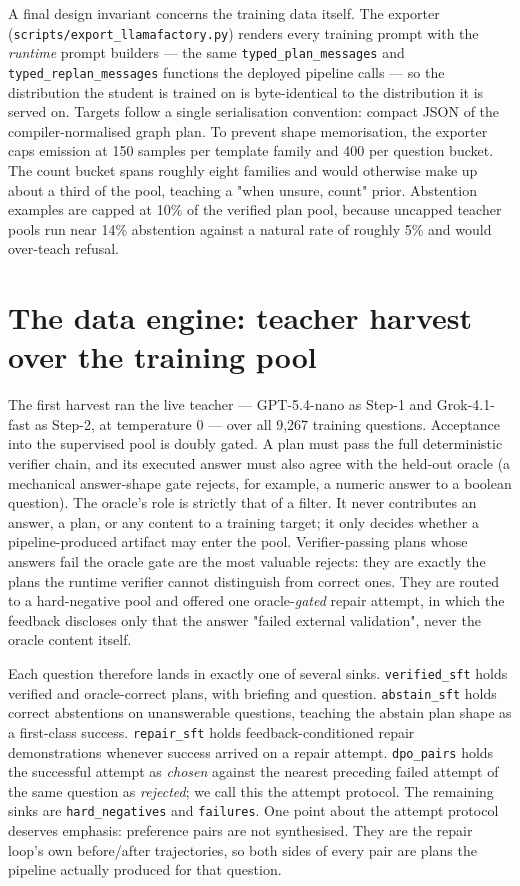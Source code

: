 A final design invariant concerns the training data itself. The exporter
(\texttt{scripts/export\_llamafactory.py}) renders every training prompt with the \emph{runtime} prompt
builders --- the same \texttt{typed\_plan\_messages} and \texttt{typed\_replan\_messages} functions the deployed
pipeline calls --- so the distribution the student is trained on is byte-identical to the
distribution it is served on. Targets follow a single serialisation convention: compact JSON
of the compiler-normalised graph plan. To prevent shape memorisation, the exporter caps
emission at 150 samples per template family and 400 per question bucket. The count bucket
spans roughly eight families and would otherwise make up about a third of the pool, teaching a
"when unsure, count" prior. Abstention examples are capped at 10\% of the verified plan pool,
because uncapped teacher pools run near 14\% abstention against a natural rate of roughly 5\%
and would over-teach refusal.

\section{The data engine: teacher harvest over the training pool}\label{sec:the-data-engine-teacher-harvest-over-the}

The first harvest ran the live teacher --- GPT-5.4-nano as Step-1 and Grok-4.1-fast as Step-2,
at temperature 0 --- over all 9,267 training questions. Acceptance into the supervised pool is
doubly gated. A plan must pass the full deterministic verifier chain, and its executed answer
must also agree with the held-out oracle (a mechanical answer-shape gate rejects, for example,
a numeric answer to a boolean question). The oracle's role is strictly that of a filter. It
never contributes an answer, a plan, or any content to a training target; it only decides
whether a pipeline-produced artifact may enter the pool. Verifier-passing plans whose answers
fail the oracle gate are the most valuable rejects: they are exactly the plans the runtime
verifier cannot distinguish from correct ones. They are routed to a hard-negative pool and
offered one oracle-\emph{gated} repair attempt, in which the feedback discloses only that the
answer "failed external validation", never the oracle content itself.

Each question therefore lands in exactly one of several sinks. \texttt{verified\_sft} holds verified
and oracle-correct plans, with briefing and question. \texttt{abstain\_sft} holds correct abstentions
on unanswerable questions, teaching the abstain plan shape as a first-class success.
\texttt{repair\_sft} holds feedback-conditioned repair demonstrations whenever success arrived on a
repair attempt. \texttt{dpo\_pairs} holds the successful attempt as \emph{chosen} against the nearest
preceding failed attempt of the same question as \emph{rejected}; we call this the attempt
protocol. The remaining sinks are \texttt{hard\_negatives} and \texttt{failures}. One point about the attempt
protocol deserves emphasis: preference pairs are not synthesised. They are the repair loop's
own before/after trajectories, so both sides of every pair are plans the pipeline actually
produced for that question.

